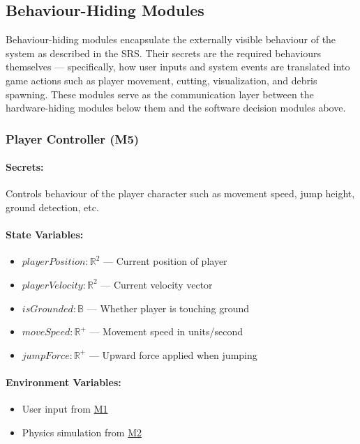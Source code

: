 \documentclass[12pt, titlepage]{article}
\begin{document}
\newpage

\subsection{Behaviour-Hiding Modules}

Behaviour-hiding modules encapsulate the externally visible behaviour of the system as
described in the SRS. Their secrets are the required behaviours themselves --- specifically,
how user inputs and system events are translated into game actions such as player movement,
cutting, visualization, and debris spawning. These modules serve as the communication layer
between the hardware-hiding modules below them and the software decision modules above.

\subsubsection{Player Controller (M5)} \label{M5}

\paragraph{Secrets:}
Controls behaviour of the player character such as movement speed, jump height, ground detection, etc.

\paragraph{State Variables:}
\begin{itemize}
\item $playerPosition : \mathbb{R}^2$ --- Current position of player
\item $playerVelocity : \mathbb{R}^2$ --- Current velocity vector
\item $isGrounded : \mathbb{B}$ --- Whether player is touching ground
\item $moveSpeed : \mathbb{R}^+$ --- Movement speed in units/second
\item $jumpForce : \mathbb{R}^+$ --- Upward force applied when jumping
\end{itemize}

\paragraph{Environment Variables:}
\begin{itemize}
\item User input from \hyperref[M1]{M1}
\item Physics simulation from \hyperref[M2]{M2}
\end{itemize}
\end{document}
